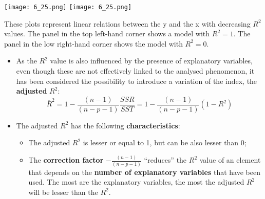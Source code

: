 \begin{frame}
  \vspace{-0.2cm}
  \begin{center}
      {\texttt{[image: 6\_25.png]}}
      {\texttt{[image: 6\_25.png]}}  
  \end{center}
  \vspace{-0.2cm}
  These plots represent linear relations between the y and the x with decreasing $ R^{2} $ values. The panel in the top left-hand corner shows a model with $ R^{2} = 1 $. The panel in the low right-hand corner shows the model with $ R^{2} = 0 $.
\end{frame}

\begin{frame}
  \vspace*{.25cm}
  \begin{itemize}
    \item As the $R^{2}$ value is also influenced by the presence of explanatory variables, even though these are not effectively linked to the analysed phenomenon, it has been considered the possibility to introduce a variation of the index, the \textbf{adjusted} {\boldmath$R^{2}$}:
      $$\overline{R}^{2}=1-\frac{(n-1)}{(n-p-1)}\frac{SSR}{SST}=1-\frac{(n-1)}{(n-p-1)}(1-R^2)$$
    \item The adjusted $R^{2}$ has the following \textbf{characteristics}:
    \begin{itemize}
      \item The adjusted $R^{2}$ is lesser or equal to 1, but can be also lesser than 0;
      \item The \textbf{correction factor} $-\frac{(n-1)}{(n-p-1)}$ ``reduces'' the $R^{2}$ value of an element that depends on the \textbf{number of explanatory variables} that have been used. The most are the explanatory variables, the most the adjusted $R^{2}$ will be lesser than the $R^{2}$.
    \end{itemize}
  \end{itemize}
\end{frame}


